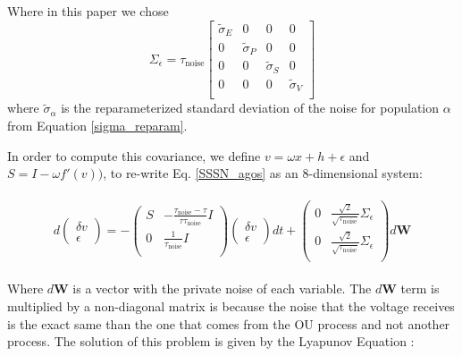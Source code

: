\documentclass[11pt]{article}
\begin{document}
Where in this paper we chose 
\begin{equation}
\Sigma_\epsilon=\tau_{\text{noise}} 
\begin{bmatrix} 
\tilde{\sigma}_E & 0 & 0 & 0 \\
0 & \tilde{\sigma}_P & 0 & 0 \\
0 & 0 & \tilde{\sigma}_S & 0 \\
0 & 0 & 0 & \tilde{\sigma}_V \\
\end{bmatrix}
\end{equation}
where $\tilde{\sigma}_\alpha$ is the reparameterized standard deviation of the noise for population $\alpha$ from Equation \ref{sigma_reparam}.

In order to compute this covariance, we define $v=\omega x +h+\epsilon$ and $S=I-\omega f'(v))$, to re-write Eq. \eqref{SSSN_agos} as an 8-dimensional system:

\begin{align}
\begin{split}
d\begin{pmatrix}
\delta v \\
 \epsilon
\end{pmatrix}= -
\begin{pmatrix}
	S &- \frac{\tau_{\text{noise}}-\tau}{\tau \tau_{\text{noise}}}I\\
	 0&\frac{1}{\tau_{\text{noise}}}I\\
\end{pmatrix}
\begin{pmatrix}
	\delta v\\
	\epsilon 
\end{pmatrix} 
dt +
\begin{pmatrix}
	0&\frac{\sqrt{2}}{\sqrt{\tau_{\text{noise}}}} \Sigma_\epsilon\\
	0&\frac{\sqrt{2}}{\sqrt{\tau_{\text{noise}}}} \Sigma_\epsilon \\
\end{pmatrix}    d\mathbf{W} 
\end{split}
\end{align}

Where $d\mathbf{W}$ is a vector with the private noise of each variable.  The $d\mathbf{W}$ term is multiplied by a non-diagonal matrix is because the noise that the voltage receives is the exact same than the one that comes from the OU process and not another process. The solution of this problem is given by the Lyapunov Equation \cite{hennequin2018dynamical,Gardiner2009}:
\end{document}
